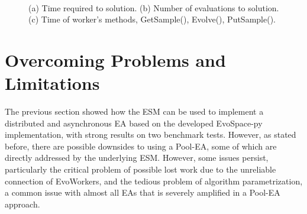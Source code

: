 \begin{figure}[t]
    \centering
    \\
    \caption{
    (a) Time required to solution.
    (b) Number of evaluations to solution. (c) Time of worker's methods, GetSample(), Evolve(), PutSample().}
    \label{fig:effort_real_time}
\end{figure}




\section{Overcoming Problems and Limitations}
\label{sec:overcome}
The previous section showed how the ESM can be used to implement a distributed and asynchronous EA based on the developed EvoSpace-py implementation,
with strong results on two benchmark tests.
However, as stated before, there are possible downsides to using a Pool-EA, some of which are directly addressed by the underlying ESM.
However, some issues persist, particularly the critical problem of possible lost work due to the unreliable connection of EvoWorkers,
and the tedious problem of algorithm parametrization, a common issue with almost all EAs that is severely amplified in a Pool-EA approach.

